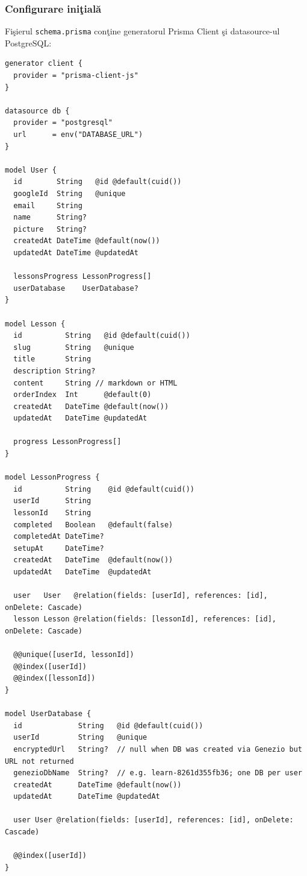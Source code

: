 \documentclass[12pt,onecolumn,draftclsnofoot]{IEEEtran}
\begin{document}
\subsubsection{Configurare ini\c{t}ial\u{a}}
Fi\c{s}ierul \texttt{schema.prisma} con\c{t}ine generatorul Prisma Client \c{s}i datasource-ul PostgreSQL:
\begin{lstlisting}[language=Prisma,caption={Schema complet\u{a} a bazei de date (schema.prisma)}]
generator client {
  provider = "prisma-client-js"
}

datasource db {
  provider = "postgresql"
  url      = env("DATABASE_URL")
}

model User {
  id        String   @id @default(cuid())
  googleId  String   @unique
  email     String
  name      String?
  picture   String?
  createdAt DateTime @default(now())
  updatedAt DateTime @updatedAt

  lessonsProgress LessonProgress[]
  userDatabase    UserDatabase?
}

model Lesson {
  id          String   @id @default(cuid())
  slug        String   @unique
  title       String
  description String?
  content     String // markdown or HTML
  orderIndex  Int      @default(0)
  createdAt   DateTime @default(now())
  updatedAt   DateTime @updatedAt

  progress LessonProgress[]
}

model LessonProgress {
  id          String    @id @default(cuid())
  userId      String
  lessonId    String
  completed   Boolean   @default(false)
  completedAt DateTime?
  setupAt     DateTime?
  createdAt   DateTime  @default(now())
  updatedAt   DateTime  @updatedAt

  user   User   @relation(fields: [userId], references: [id], onDelete: Cascade)
  lesson Lesson @relation(fields: [lessonId], references: [id], onDelete: Cascade)

  @@unique([userId, lessonId])
  @@index([userId])
  @@index([lessonId])
}

model UserDatabase {
  id             String   @id @default(cuid())
  userId         String   @unique
  encryptedUrl   String?  // null when DB was created via Genezio but URL not returned
  genezioDbName  String?  // e.g. learn-8261d355fb36; one DB per user
  createdAt      DateTime @default(now())
  updatedAt      DateTime @updatedAt

  user User @relation(fields: [userId], references: [id], onDelete: Cascade)

  @@index([userId])
}
\end{lstlisting}
\end{document}
